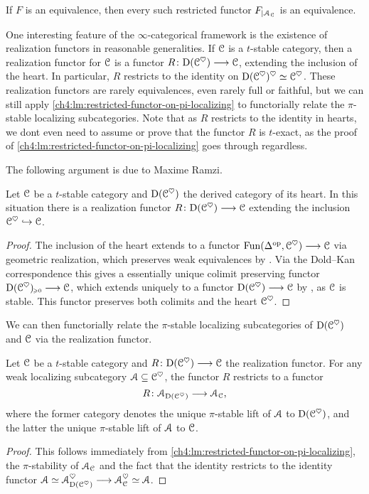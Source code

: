 \begin{corollary}
    If $F$ is an equivalence, then every such restricted functor $F_{\vert \EuScript{A}_{\EuScript{C}}}$ is an equivalence. 
\end{corollary}

One interesting feature of the $\infty$-categorical framework is the existence of realization functors in reasonable generalities. If $\EuScript{C}$ is a $t$-stable category, then a realization functor for $\EuScript{C}$ is a functor $R\colon\mathrm{D}(\EuScript{C}^{\heartsuit})\longrightarrow \EuScript{C}$, extending the inclusion of the heart. In particular, $R$ restricts to the identity on $\mathrm{D}(\EuScript{C}^\heartsuit)^\heartsuit\simeq \EuScript{C}^\heartsuit$. These realization functors are rarely equivalences, even rarely full or faithful, but we can still apply \cref{ch4:lm:restricted-functor-on-pi-localizing} to functorially relate the $\pi$-stable localizing subcategories. Note that as $R$ restricts to the identity in hearts, we dont even need to assume or prove that the functor $R$ is $t$-exact, as the proof of \cref{ch4:lm:restricted-functor-on-pi-localizing} goes through regardless.  

The following argument is due to Maxime Ramzi.

\begin{lemma}
    Let $\EuScript{C}$ be a $t$-stable category and $\mathrm{D}(\EuScript{C}^\heartsuit)$ the derived category of its heart. In this situation there is a realization functor $R\colon\mathrm{D}(\EuScript{C}^{\heartsuit})\longrightarrow \EuScript{C}$ extending the inclusion $\EuScript{C}^\heartsuit\hookrightarrow \EuScript{C}$. 
\end{lemma}
\begin{proof}
     The inclusion of the heart extends to a functor $\operatorname{Fun}(\Delta^{\mathrm{op}}, \EuScript{C}^\heartsuit)\longrightarrow \EuScript{C}$ via geometric realization, which preserves weak equivalences by \cite[1.2.4.4, 1.2.4.5]{Lurie_HA}. Via the Dold--Kan correspondence this gives a essentially unique colimit preserving functor $\mathrm{D}(\EuScript{C}^\heartsuit)_{\hspace{-1pt}\scriptscriptstyle\geqslant 0}\longrightarrow \EuScript{C}$, which extends uniquely to a functor $\mathrm{D}(\EuScript{C}^\heartsuit)\longrightarrow \EuScript{C}$ by \cite[1.4.4.5]{Lurie_HA}, as $\EuScript{C}$ is stable. This functor preserves both colimits and the heart $\EuScript{C}^\heartsuit$. 
\end{proof}

We can then functorially relate the $\pi$-stable localizing subcategories of $\mathrm{D}(\EuScript{C}^\heartsuit)$ and $\EuScript{C}$ via the realization functor. 

\begin{corollary}
    Let $\EuScript{C}$ be a $t$-stable category and $R\colon \mathrm{D}(\EuScript{C}^\heartsuit)\longrightarrow \EuScript{C}$ the realization functor. For any weak localizing subcategory $\EuScript{A}\subseteq \EuScript{C}^\heartsuit$, the functor $R$ restricts to a functor
    \[R\colon \EuScript{A}_{\mathrm{D}(\EuScript{C}^\heartsuit)}\longrightarrow \EuScript{A}_{\EuScript{C}},\]
    where the former category denotes the unique $\pi$-stable lift of $\EuScript{A}$ to $\mathrm{D}(\EuScript{C}^\heartsuit)$, and the latter the unique $\pi$-stable lift of $\EuScript{A}$ to $\EuScript{C}$. 
\end{corollary}
\begin{proof}
    This follows immediately from \cref{ch4:lm:restricted-functor-on-pi-localizing}, the $\pi$-stability of $\EuScript{A}_{\EuScript{C}}$ and the fact that the identity restricts to the identity functor $\EuScript{A}\simeq\EuScript{A}_{\mathrm{D}(\EuScript{C}^\heartsuit)}^\heartsuit \longrightarrow \EuScript{A}_{\EuScript{C}}^\heartsuit\simeq \EuScript{A}$. 
\end{proof}


